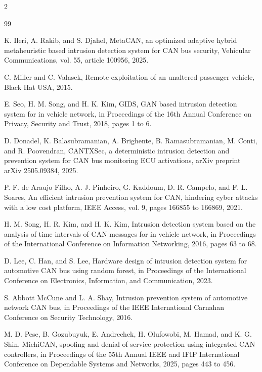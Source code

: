 \documentclass[11pt]{article}
\begin{document}
\clearpage
\onecolumn
\begin{multicols}{2}
\begin{thebibliography}{99}
\footnotesize
\setlength{\itemsep}{0pt}
\setlength{\parskip}{0pt}
\setlength{\parsep}{0pt}

K. Ileri, A. Rakib, and S. Djahel, MetaCAN, an optimized adaptive hybrid metaheuristic based intrusion detection system for CAN bus security, Vehicular Communications, vol. 55, article 100956, 2025.

C. Miller and C. Valasek, Remote exploitation of an unaltered passenger vehicle, Black Hat USA, 2015.

E. Seo, H. M. Song, and H. K. Kim, GIDS, GAN based intrusion detection system for in vehicle network, in Proceedings of the 16th Annual Conference on Privacy, Security and Trust, 2018, pages 1 to 6.

D. Donadel, K. Balasubramanian, A. Brighente, B. Ramasubramanian, M. Conti, and R. Poovendran, CANTXSec, a deterministic intrusion detection and prevention system for CAN bus monitoring ECU activations, arXiv preprint arXiv 2505.09384, 2025.

P. F. de Araujo Filho, A. J. Pinheiro, G. Kaddoum, D. R. Campelo, and F. L. Soares, An efficient intrusion prevention system for CAN, hindering cyber attacks with a low cost platform, IEEE Access, vol. 9, pages 166855 to 166869, 2021.

H. M. Song, H. R. Kim, and H. K. Kim, Intrusion detection system based on the analysis of time intervals of CAN messages for in vehicle network, in Proceedings of the International Conference on Information Networking, 2016, pages 63 to 68.

D. Lee, C. Han, and S. Lee, Hardware design of intrusion detection system for automotive CAN bus using random forest, in Proceedings of the International Conference on Electronics, Information, and Communication, 2023.

S. Abbott McCune and L. A. Shay, Intrusion prevention system of automotive network CAN bus, in Proceedings of the IEEE International Carnahan Conference on Security Technology, 2016.

M. D. Pese, B. Gozubuyuk, E. Andrechek, H. Olufowobi, M. Hamad, and K. G. Shin, MichiCAN, spoofing and denial of service protection using integrated CAN controllers, in Proceedings of the 55th Annual IEEE and IFIP International Conference on Dependable Systems and Networks, 2025, pages 443 to 456.


\end{thebibliography}
\end{multicols}
\end{document}
